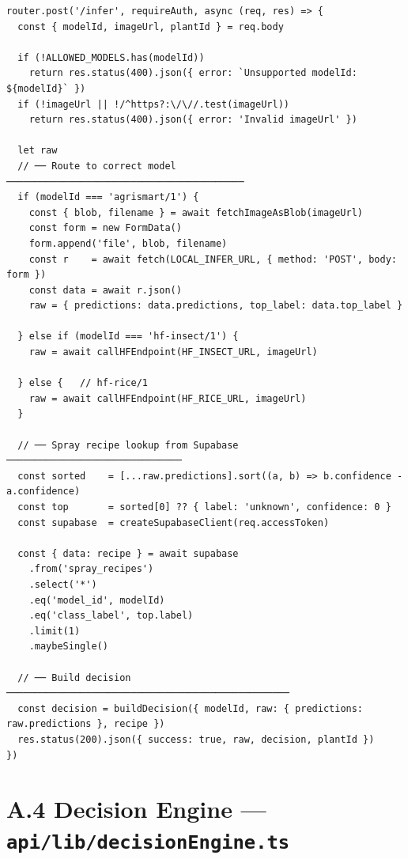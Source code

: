 \documentclass[12pt,a4paper]{report}
\begin{document}
\begin{lstlisting}[style=typescript, caption={Main inference route with model routing and decision engine (api/routes/roboflow.ts)}]
router.post('/infer', requireAuth, async (req, res) => {
  const { modelId, imageUrl, plantId } = req.body

  if (!ALLOWED_MODELS.has(modelId))
    return res.status(400).json({ error: `Unsupported modelId: ${modelId}` })
  if (!imageUrl || !/^https?:\/\//.test(imageUrl))
    return res.status(400).json({ error: 'Invalid imageUrl' })

  let raw
  // ── Route to correct model ──────────────────────────────────────────
  if (modelId === 'agrismart/1') {
    const { blob, filename } = await fetchImageAsBlob(imageUrl)
    const form = new FormData()
    form.append('file', blob, filename)
    const r    = await fetch(LOCAL_INFER_URL, { method: 'POST', body: form })
    const data = await r.json()
    raw = { predictions: data.predictions, top_label: data.top_label }

  } else if (modelId === 'hf-insect/1') {
    raw = await callHFEndpoint(HF_INSECT_URL, imageUrl)

  } else {   // hf-rice/1
    raw = await callHFEndpoint(HF_RICE_URL, imageUrl)
  }

  // ── Spray recipe lookup from Supabase ───────────────────────────────
  const sorted    = [...raw.predictions].sort((a, b) => b.confidence - a.confidence)
  const top       = sorted[0] ?? { label: 'unknown', confidence: 0 }
  const supabase  = createSupabaseClient(req.accessToken)

  const { data: recipe } = await supabase
    .from('spray_recipes')
    .select('*')
    .eq('model_id', modelId)
    .eq('class_label', top.label)
    .limit(1)
    .maybeSingle()

  // ── Build decision ──────────────────────────────────────────────────
  const decision = buildDecision({ modelId, raw: { predictions: raw.predictions }, recipe })
  res.status(200).json({ success: true, raw, decision, plantId })
})
\end{lstlisting}

\newpage

\section*{A.4 \quad Decision Engine --- \texttt{api/lib/decisionEngine.ts}}
\end{document}
